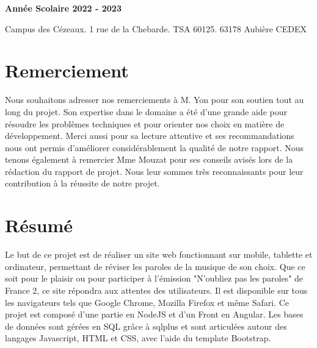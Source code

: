 \documentclass[12pt,french]{article}
\begin{document}
\begin{titlepage}
\begin{minipage}{.45\linewidth}
\begin{flushright}
  			\textbf{Année Scolaire 2022 - 2023}
  		\end{flushright} 
  	\end{minipage}
  	
  	\vspace*{2cm} 
  	
    Campus des Cézeaux. 1 rue de la Chebarde. TSA 60125. 63178 Aubière CEDEX
    	

\end{titlepage}

\restoregeometry


\newpage

\vspace*{1cm}

\section*{Remerciement}

Nous souhaitons adresser nos remerciements à M. Yon pour son soutien tout au long du projet.
Son expertise dans le domaine a été d'une grande aide pour résoudre les problèmes techniques et pour orienter nos choix en matière de développement.
Merci aussi pour sa lecture attentive et ses recommandations nous ont permis d'améliorer considérablement la qualité de notre rapport.
Nous tenons également à remercier Mme Mouzat pour ses conseils avisés lors de la rédaction du rapport de projet.
Nous leur sommes très reconnaissants pour leur contribution à la réussite de notre projet.



\renewcommand{\listfigurename}{Table des illustrations}
\listoffigures

\newpage

\vspace*{1cm}

\section*{Résumé}


Le but de ce projet est de réaliser un site web fonctionnant sur mobile, tablette et ordinateur, permettant de réviser les paroles de la musique de son choix. Que ce soit pour le plaisir ou pour participer à l'émission "N'oubliez pas les paroles" de France 2, ce site répondra aux attentes des utilisateurs. Il est disponible sur tous les navigateurs tels que Google Chrome, Mozilla Firefox et même Safari. Ce projet est composé d'une partie  en NodeJS et d'un \gls{Front} en Angular. Les bases de données sont gérées en \gls{SQL} grâce à sqlplus et sont articulées autour des langages \gls{Javascript}, \gls{HTML} et \gls{CSS}, avec l'aide du template Bootstrap.
\newline 
\end{document}
